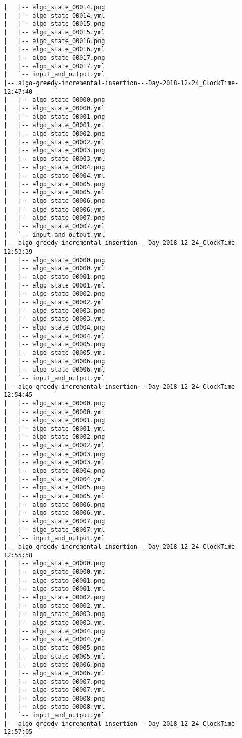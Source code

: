 \begin{verbatim}
|   |-- algo_state_00014.png
|   |-- algo_state_00014.yml
|   |-- algo_state_00015.png
|   |-- algo_state_00015.yml
|   |-- algo_state_00016.png
|   |-- algo_state_00016.yml
|   |-- algo_state_00017.png
|   |-- algo_state_00017.yml
|   `-- input_and_output.yml
|-- algo-greedy-incremental-insertion---Day-2018-12-24_ClockTime-12:47:40
|   |-- algo_state_00000.png
|   |-- algo_state_00000.yml
|   |-- algo_state_00001.png
|   |-- algo_state_00001.yml
|   |-- algo_state_00002.png
|   |-- algo_state_00002.yml
|   |-- algo_state_00003.png
|   |-- algo_state_00003.yml
|   |-- algo_state_00004.png
|   |-- algo_state_00004.yml
|   |-- algo_state_00005.png
|   |-- algo_state_00005.yml
|   |-- algo_state_00006.png
|   |-- algo_state_00006.yml
|   |-- algo_state_00007.png
|   |-- algo_state_00007.yml
|   `-- input_and_output.yml
|-- algo-greedy-incremental-insertion---Day-2018-12-24_ClockTime-12:53:39
|   |-- algo_state_00000.png
|   |-- algo_state_00000.yml
|   |-- algo_state_00001.png
|   |-- algo_state_00001.yml
|   |-- algo_state_00002.png
|   |-- algo_state_00002.yml
|   |-- algo_state_00003.png
|   |-- algo_state_00003.yml
|   |-- algo_state_00004.png
|   |-- algo_state_00004.yml
|   |-- algo_state_00005.png
|   |-- algo_state_00005.yml
|   |-- algo_state_00006.png
|   |-- algo_state_00006.yml
|   `-- input_and_output.yml
|-- algo-greedy-incremental-insertion---Day-2018-12-24_ClockTime-12:54:45
|   |-- algo_state_00000.png
|   |-- algo_state_00000.yml
|   |-- algo_state_00001.png
|   |-- algo_state_00001.yml
|   |-- algo_state_00002.png
|   |-- algo_state_00002.yml
|   |-- algo_state_00003.png
|   |-- algo_state_00003.yml
|   |-- algo_state_00004.png
|   |-- algo_state_00004.yml
|   |-- algo_state_00005.png
|   |-- algo_state_00005.yml
|   |-- algo_state_00006.png
|   |-- algo_state_00006.yml
|   |-- algo_state_00007.png
|   |-- algo_state_00007.yml
|   `-- input_and_output.yml
|-- algo-greedy-incremental-insertion---Day-2018-12-24_ClockTime-12:55:58
|   |-- algo_state_00000.png
|   |-- algo_state_00000.yml
|   |-- algo_state_00001.png
|   |-- algo_state_00001.yml
|   |-- algo_state_00002.png
|   |-- algo_state_00002.yml
|   |-- algo_state_00003.png
|   |-- algo_state_00003.yml
|   |-- algo_state_00004.png
|   |-- algo_state_00004.yml
|   |-- algo_state_00005.png
|   |-- algo_state_00005.yml
|   |-- algo_state_00006.png
|   |-- algo_state_00006.yml
|   |-- algo_state_00007.png
|   |-- algo_state_00007.yml
|   |-- algo_state_00008.png
|   |-- algo_state_00008.yml
|   `-- input_and_output.yml
|-- algo-greedy-incremental-insertion---Day-2018-12-24_ClockTime-12:57:05

\end{verbatim}
